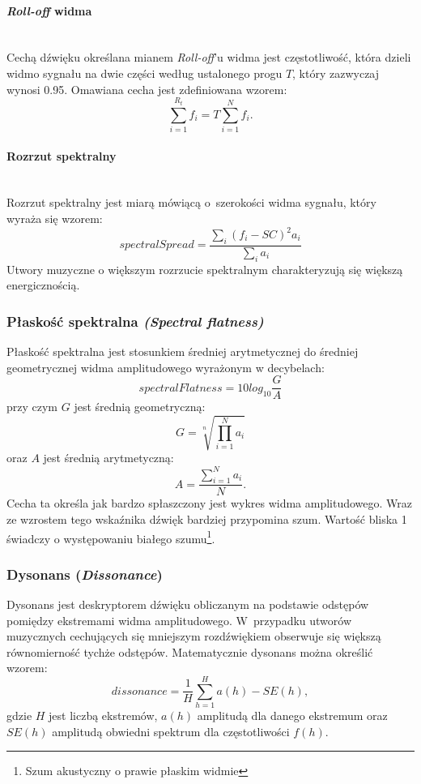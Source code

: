 \paragraph{\emph{Roll-off} widma}\mbox{}\\
Cechą dźwięku określana mianem \emph{Roll-off}'u widma jest częstotliwość, która dzieli widmo sygnału na dwie części według ustalonego progu $T$, który zazwyczaj wynosi 0.95\cite{phdWork}. Omawiana cecha jest zdefiniowana wzorem\cite{rollOff}:
\begin{equation}
\sum_{i=1}^{R_t}f_i = T \sum_{i=1}^{N}f_i.
\end{equation}

\paragraph{Rozrzut spektralny}\mbox{}\\
Rozrzut spektralny jest miarą mówiącą o~szerokości widma sygnału, który wyraża się wzorem:
\begin{equation}
spectralSpread = \frac{\sum_{i}^{}(f_i - SC)^2 a_i}{\sum_{i}a_i} 
\end{equation}
Utwory muzyczne o większym rozrzucie spektralnym charakteryzują się większą energicznością. %

\subsubsection{Płaskość spektralna \emph{(Spectral flatness)}}
Płaskość spektralna jest stosunkiem średniej arytmetycznej do średniej geometrycznej widma amplitudowego wyrażonym w decybelach:
\begin{equation}
spectralFlatness=10 log_{10} \frac{G}{A}
\end{equation}
przy czym $G$ jest średnią geometryczną:
\begin{equation}
G=\sqrt[n]{\prod_{i=1}^{N} a_i}
\end{equation}
oraz $A$ jest średnią arytmetyczną:
\begin{equation}
A=\frac{\sum_{i=1}^{N}a_i}{N}.
\end{equation}
Cecha ta określa jak bardzo spłaszczony jest wykres widma amplitudowego. Wraz ze wzrostem tego wskaźnika dźwięk bardziej przypomina szum. Wartość bliska 1 świadczy o występowaniu białego szumu\footnote{Szum akustyczny o prawie płaskim widmie}\cite{phdWork}.


\subsubsection{Dysonans (\emph{Dissonance})}
Dysonans jest deskryptorem dźwięku obliczanym na podstawie odstępów pomiędzy ekstremami widma amplitudowego. W~przypadku utworów muzycznych cechujących się mniejszym rozdźwiękiem obserwuje się większą równomierność tychże odstępów. Matematycznie dysonans można określić wzorem:
\begin{equation}
dissonance = \frac{1}{H}\sum_{h=1}^{H} a(h) - SE(h),
\end{equation}
gdzie $H$ jest liczbą ekstremów, $a(h)$ amplitudą dla danego ekstremum oraz $SE(h)$ amplitudą obwiedni spektrum dla częstotliwości $f(h)$\cite{phdWork}.

